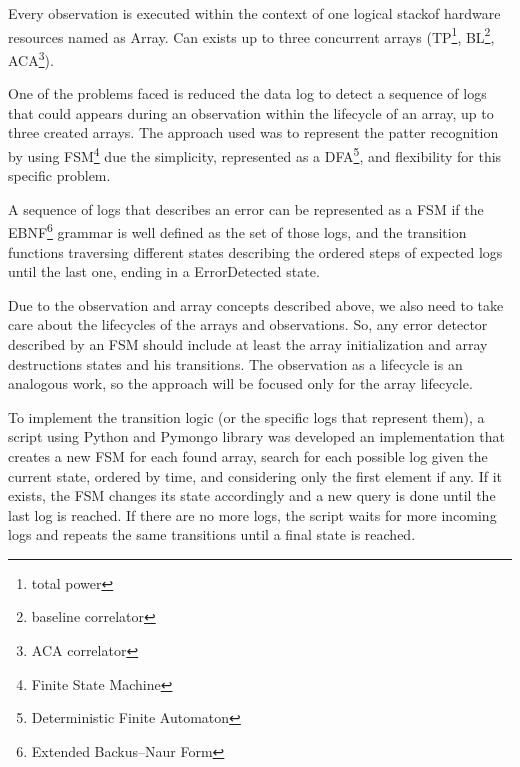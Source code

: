\documentclass[]{spie}  %
\begin{document}
Every observation is executed within the context of one logical stackof hardware resources named as
Array. Can exists up to three concurrent arrays (TP\footnote{total power}, BL\footnote{baseline correlator}, ACA\footnote{ACA correlator}).


One of the problems faced is reduced the data log to detect a sequence of logs that could appears during an observation within the lifecycle of an array, up to three created arrays. The approach used was to represent the patter recognition by using FSM\footnote{Finite State Machine} due the simplicity, represented as a DFA\footnote{Deterministic Finite Automaton}, and flexibility for this specific problem. 

A sequence of logs that describes an error can be represented as a FSM if the EBNF\footnote{Extended Backus–Naur Form} grammar is well defined as the set of those logs, and the transition functions traversing different states describing the ordered steps of expected logs until the last one, ending in a ErrorDetected state. 

Due to the observation and array concepts described above, we also need to take
care about the lifecycles of the arrays and observations. So, any error
detector described by an FSM should include at least the array initialization
and array destructions states and his transitions. The observation as a lifecycle is an analogous work, so the approach will be focused only for the array lifecycle.

To implement the transition logic (or the specific logs that represent them), a script using Python and Pymongo library
was developed an implementation that creates a new FSM for each found array, search for each possible log given the current state, ordered by time, and considering only
the first element if any. If it exists, the FSM changes its state
accordingly and a new query is done until the last log is reached. If there
are no more logs, the script waits for more incoming logs and repeats the same transitions
until a final state is reached.
\end{document}
